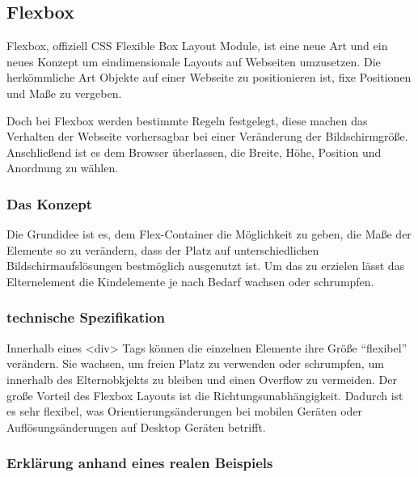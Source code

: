 \hypertarget{flexbox}{%
\subsection{Flexbox}\label{flexbox}}

Flexbox, offiziell CSS Flexible Box Layout Module, ist eine neue Art und
ein neues Konzept um eindimensionale Layouts auf Webseiten umzusetzen.
Die herkömmliche Art Objekte auf einer Webseite zu positionieren ist,
fixe Positionen und Maße zu vergeben.

Doch bei Flexbox werden bestimmte Regeln festgelegt, diese machen das
Verhalten der Webseite vorhersagbar bei einer Veränderung der
Bildschirmgröße. Anschließend ist es dem Browser überlassen, die Breite,
Höhe, Position und Anordnung zu wählen.

\hypertarget{das-konzept}{%
\subsubsection{Das Konzept}\label{das-konzept}}

Die Grundidee ist es, dem Flex-Container die Möglichkeit zu geben, die
Maße der Elemente so zu verändern, dass der Platz auf unterschiedlichen
Bildschirmaufslösungen bestmöglich ausgenutzt ist. Um das zu erzielen
lässt das Elternelement die Kindelemente je nach Bedarf wachsen oder
schrumpfen.

\hypertarget{technische-spezifikation}{%
\subsubsection{technische
Spezifikation}\label{technische-spezifikation}}

Innerhalb eines \textless{}div\textgreater{} Tags können die einzelnen
Elemente ihre Größe ``flexibel'' verändern. Sie wachsen, um freien Platz
zu verwenden oder schrumpfen, um innerhalb des Elternobkjekts zu bleiben
und einen Overflow zu vermeiden. Der große Vorteil des Flexbox Layouts
ist die Richtungsunabhängigkeit. Dadurch ist es sehr flexibel, was
Orientierungsänderungen bei mobilen Geräten oder Auflösungsänderungen
auf Desktop Geräten betrifft.

\hypertarget{erkluxe4rung-anhand-eines-realen-beispiels}{%
\subsubsection{Erklärung anhand eines realen
Beispiels}\label{erkluxe4rung-anhand-eines-realen-beispiels}}

